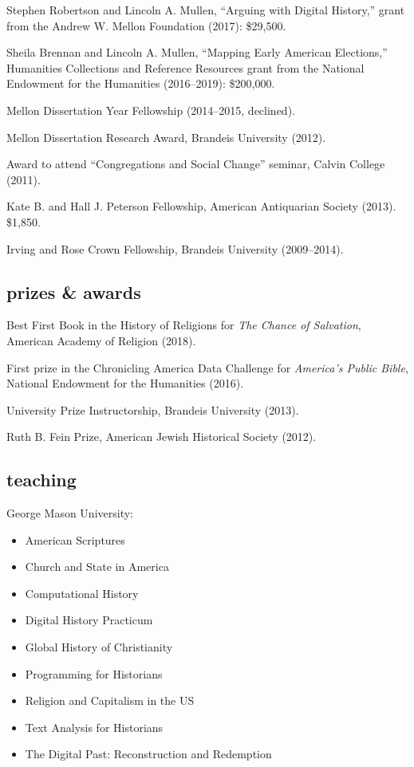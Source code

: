 \documentclass[11pt]{article}
\providecommand{\tightlist}{%
  \setlength{\itemsep}{0pt}\setlength{\parskip}{0pt}}
\begin{document}
Stephen Robertson and Lincoln A. Mullen, ``Arguing with Digital History,'' grant from the Andrew W. Mellon Foundation (2017): \$29,500.

Sheila Brennan and Lincoln A. Mullen, ``Mapping Early American Elections,'' Humanities Collections and Reference Resources grant from the National Endowment for the Humanities (2016--2019): \$200,000. 

Mellon Dissertation Year Fellowship (2014--2015, declined).

Mellon Dissertation Research Award, Brandeis University (2012).

Award to attend ``Congregations and Social Change'' seminar, Calvin College 
(2011).

Kate B. and Hall J. Peterson Fellowship, American Antiquarian Society (2013). \$1,850.

Irving and Rose Crown Fellowship, Brandeis University (2009--2014).

\subsection{prizes \& awards}\label{prizes-and-awards}

Best First Book in the History of Religions for \emph{The Chance of Salvation}, American Academy of Religion (2018).

First prize in the Chronicling America Data Challenge for \emph{America's Public Bible}, National Endowment for the Humanities (2016).

University Prize Instructorship, Brandeis University (2013).

Ruth B. Fein Prize, American Jewish Historical Society (2012). 

\subsection{teaching}\label{teaching}

George Mason University:

\vspace{-0.15in}

\begin{itemize}
    \tightlist
  \item American Scriptures 
  \item Church and State in America
  \item Computational History 
  \item Digital History Practicum
  \item Global History of Christianity 
  \item Programming for Historians 
  \item Religion and Capitalism in the US 
  \item Text Analysis for Historians 
  \item The Digital Past: Reconstruction and Redemption
\end{itemize}
\end{document}
